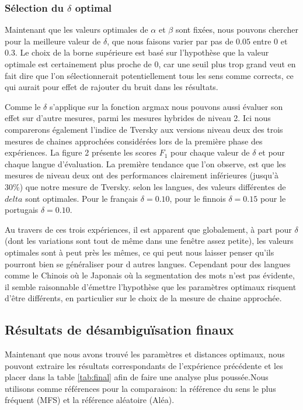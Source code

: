 \documentclass[10pt,a4paper,twoside]{article}
\begin{document}
\subsubsection{Sélection du \(\delta\) optimal}
Maintenant que les valeurs optimales de  \(\alpha\) et \(\beta\) sont fixées, nous pouvons chercher pour la meilleure valeur de \(\delta\), que nous faisons varier par pas de \(0.05\) entre \(0\) et \(0.3\). Le choix de la borne supérieure est basé sur l'hypothèse que la valeur optimale est certainement plus proche de 0, car une seuil plus trop grand veut en fait dire que l'on sélectionnerait potentiellement tous les sens comme corrects, ce qui aurait pour effet de rajouter du bruit dans les résultats.

Comme  le \(\delta\) s'applique sur la fonction argmax nous pouvons aussi évaluer son effet sur d'autre mesures, parmi les mesures hybrides de niveau 2. Ici nous comparerons également l'indice de Tversky aux versions niveau deux des trois mesures de chaines approchées considérées lors de la première phase des expériences.
La figure 2 présente  les scores \(F_1\) pour chaque valeur de \(\delta\) et pour chaque langue d'évaluation. La première tendance que l'on observe, est que les mesures de niveau deux ont des performances clairement inférieures (jusqu'à 30\%) que notre mesure de Tversky. selon les langues, des valeurs différentes de \(delta\) sont optimales. Pour le français  \(\delta=0.10\), pour le finnois \(\delta=0.15\)
pour le portugais \(\delta=0.10\). 

Au travers de ces trois expériences, il est apparent que globalement, à part pour \(\delta\) (dont les variations sont tout de même dans une fenêtre assez petite), les valeurs optimales sont à peut près les mêmes, ce qui peut nous laisser penser qu'ils pourront bien se généraliser pour d autres langues. Cependant pour des langues comme le Chinois où le Japonais où la segmentation des mots n'est pas évidente, il semble raisonnable d'émettre l'hypothèse que les paramètres optimaux risquent d'être différents, en particulier sur le choix de la mesure de chaine approchée.

\subsection{Résultats de désambiguïsation finaux}

Maintenant que nous avons trouvé les paramètres et distances optimaux, nous pouvont extraire les résultats correspondants de l'expérience précédente et les placer dans la table \ref{tab:final} afin de faire une analyse plus poussée.Nous utilisons comme références pour la comparaison: la référence du sens le plus fréquent (MFS) et la référence aléatoire (Aléa).
\end{document}

